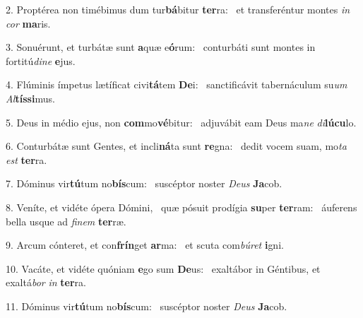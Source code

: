 2. Proptérea non timébimus dum tur\textbf{bá}bitur \textbf{ter}ra: \ast\  et transferéntur montes \textit{in} \textit{cor} \textbf{ma}ris.\

3. Sonuérunt, et turbátæ sunt \textbf{a}quæ e\textbf{ó}rum: \ast\  conturbáti sunt montes in fortitú\textit{di}\textit{ne} \textbf{e}jus.\

4. Flúminis ímpetus lætíficat civi\textbf{tá}tem \textbf{De}i: \ast\  sanctificávit tabernáculum su\textit{um} \textit{Al}\textbf{tís}\textbf{si}mus.\

5. Deus in médio ejus, non \textbf{com}mo\textbf{vé}bitur: \ast\  adjuvábit eam Deus ma\textit{ne} \textit{di}\textbf{lú}\textbf{cu}lo.\

6. Conturbátæ sunt Gentes, et incli\textbf{ná}ta sunt \textbf{re}gna: \ast\  dedit vocem suam, mo\textit{ta} \textit{est} \textbf{ter}ra.\

7. Dóminus vir\textbf{tú}tum no\textbf{bís}cum: \ast\  suscéptor noster \textit{De}\textit{us} \textbf{Ja}cob.\

8. Veníte, et vidéte ópera Dómini, \dag\  quæ pósuit prodígia \textbf{su}per \textbf{ter}ram: \ast\  áuferens bella usque ad \textit{fi}\textit{nem} \textbf{ter}ræ.\

9. Arcum cónteret, et con\textbf{frín}get \textbf{ar}ma: \ast\  et scuta com\textit{bú}\textit{ret} \textbf{i}gni.\

10. Vacáte, et vidéte quóniam \textbf{e}go sum \textbf{De}us: \ast\  exaltábor in Géntibus, et exaltá\textit{bor} \textit{in} \textbf{ter}ra.\

11. Dóminus vir\textbf{tú}tum no\textbf{bís}cum: \ast\  suscéptor noster \textit{De}\textit{us} \textbf{Ja}cob.\

